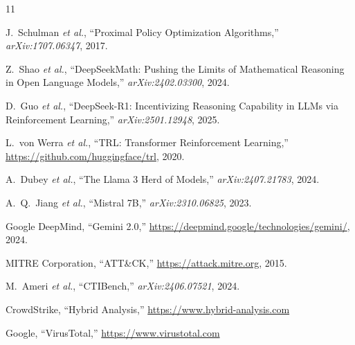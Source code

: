 \documentclass[conference,compsoc]{IEEEtran}
\begin{document}
\begin{thebibliography}{11}

J.~Schulman \emph{et al.}, ``Proximal Policy Optimization Algorithms,''
\emph{arXiv:1707.06347}, 2017.

Z.~Shao \emph{et al.}, ``DeepSeekMath: Pushing the Limits of Mathematical
Reasoning in Open Language Models,'' \emph{arXiv:2402.03300}, 2024.

D.~Guo \emph{et al.}, ``DeepSeek-R1: Incentivizing Reasoning Capability
in LLMs via Reinforcement Learning,'' \emph{arXiv:2501.12948}, 2025.

L.~von Werra \emph{et al.}, ``TRL: Transformer Reinforcement Learning,''
\url{https://github.com/huggingface/trl}, 2020.

A.~Dubey \emph{et al.}, ``The Llama 3 Herd of Models,''
\emph{arXiv:2407.21783}, 2024.

A.~Q.~Jiang \emph{et al.}, ``Mistral 7B,'' \emph{arXiv:2310.06825}, 2023.

Google DeepMind, ``Gemini 2.0,''
\url{https://deepmind.google/technologies/gemini/}, 2024.

MITRE Corporation, ``ATT\&CK,'' \url{https://attack.mitre.org}, 2015.

M.~Ameri \emph{et al.}, ``CTIBench,'' \emph{arXiv:2406.07521}, 2024.

CrowdStrike, ``Hybrid Analysis,'' \url{https://www.hybrid-analysis.com}

Google, ``VirusTotal,'' \url{https://www.virustotal.com}

\end{thebibliography}
\end{document}
